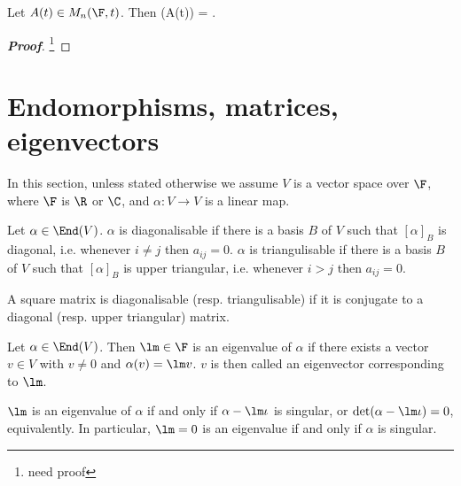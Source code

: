 

\begin{theorem}
Let $A(t) \in M_n(\F,t)$. Then %
\be
{} \det (A(t)) = \tr {}. 
\ee
\end{theorem}

\begin{proof}[\bf Proof]
\footnote{need proof}
\end{proof}


\section{Endomorphisms, matrices, eigenvectors}

In this section, unless stated otherwise we assume $V$ is a vector space over $\F$, where $\F$ is $\R$ or $\C$, and $\alpha : V \to V$ is a linear map.

\begin{definition}
Let $\alpha \in \End(V)$. $\alpha$ is diagonalisable if there is a basis $B$ of $V$ such that $[\alpha]_B$ is diagonal, i.e. whenever $i \neq j$ then $a_{ij} = 0$. $\alpha$ is triangulisable if there is a basis $B$ of $V$ such that $[\alpha]_B$ is upper triangular, i.e. whenever $i > j$ then $a_{ij} = 0$.

A square matrix is diagonalisable (resp. triangulisable) if it is conjugate to a diagonal (resp. upper triangular) matrix.
\end{definition}

\begin{definition}
Let $\alpha \in \End(V )$. Then $\lm \in \F$ is an eigenvalue of $\alpha$ if there exists a vector $v \in V$ with $v \neq 0$ and $\alpha(v) = \lm v$. $v$ is then called an eigenvector corresponding to $\lm$.
\end{definition}

\begin{remark}
$\lm$ is an eigenvalue of $\alpha$ if and only if $\alpha - \lm\iota$ is singular, or $\det(\alpha - \lm\iota) = 0$, equivalently. In particular, $\lm = 0$ is an eigenvalue if and only if $\alpha$ is singular.
\end{remark}


